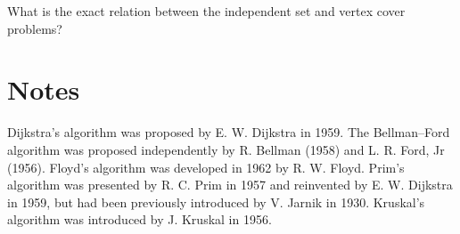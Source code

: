\begin{Exercise}\label{exr:indset}
What is the exact relation between the independent set and vertex cover problems?
\end{Exercise}

\section{Notes}

Dijkstra's algorithm was proposed by E. W. Dijkstra in 1959.
The Bellman--Ford algorithm was proposed independently by R.
Bellman (1958) and L. R. Ford, Jr (1956). Floyd's algorithm was developed in 
1962 by R. W. Floyd. Prim's algorithm was presented by R. C. Prim in 1957
and reinvented by E. W. Dijkstra in 1959, but had been previously introduced by 
V. Jarnik in 1930. Kruskal's algorithm was introduced by J. Kruskal in 1956.

